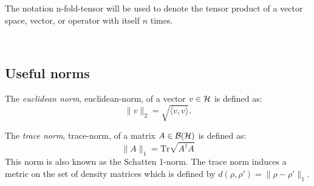 The notation \gls{n-fold-tensor}  will be used to  denote the tensor product of a vector space, vector, or operator with itself $n$ times.



\



\subsection{Useful norms }


\begin{definition} \label{eq:euclidean_distance}
  The \emph{euclidean norm}, \gls{euclidean-norm}, of a vector $v \in \mathcal{H} $ is defined as:
  \begin{equation*}
    \lVert v \rVert_{2} = \sqrt{\langle v, v\rangle}. 
    \end{equation*}
\end{definition}


\begin{definition}\label{def:trace-norm-matriz}
  The \emph{trace norm}, \gls{trace-norm}, of a matrix $A \in \mathcal{B}(\mathcal{H})$ is defined as:
  \begin{equation*} \label{eq:trace_norm_matrix_tr}
    \lVert A \rVert_{1} = \text{Tr} \sqrt{A^{\dagger}A}
  \end{equation*}
  This norm is also  known as the Schatten 1-norm. The trace norm induces a metric on the set of density matrices which is defined by $d(\rho, \rho') = \lVert \rho - \rho'\rVert_1$.
\end{definition}

